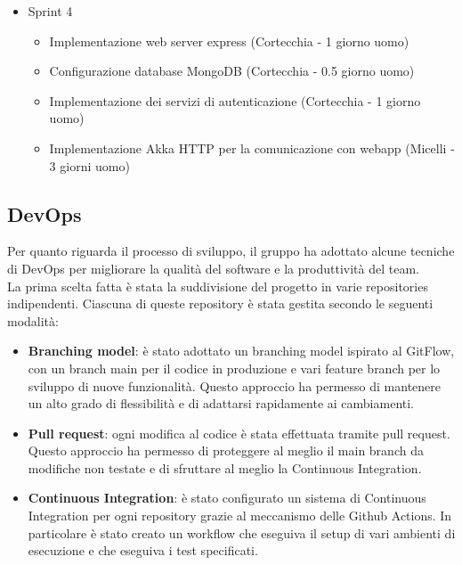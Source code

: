 \begin{itemize}
\begin{itemize}
          \end{itemize}
    \item Sprint 4
          \begin{itemize}
              \item Implementazione web server express (Cortecchia - 1 giorno uomo)
              \item Configurazione database MongoDB (Cortecchia - 0.5 giorno uomo)
              \item Implementazione dei servizi di autenticazione (Cortecchia - 1 giorno uomo)
              \item Implementazione Akka HTTP per la comunicazione con webapp (Micelli - 3 giorni uomo)
          \end{itemize}
\end{itemize}

\subsection{DevOps}
Per quanto riguarda il processo di sviluppo, il gruppo ha adottato alcune tecniche di DevOps per migliorare la qualità del software e la produttività del team.\\
La prima scelta fatta è stata la suddivisione del progetto in varie repositories indipendenti. Ciascuna di queste repository è stata gestita secondo le seguenti modalità:

\begin{itemize}
    \item \textbf{Branching model}: è stato adottato un branching model ispirato al GitFlow, con un branch main per il codice in produzione e vari feature branch per lo sviluppo di nuove funzionalità. Questo approccio ha permesso di mantenere un alto grado di flessibilità e di adattarsi rapidamente ai cambiamenti.
    \item \textbf{Pull request}: ogni modifica al codice è stata effettuata tramite pull request. Questo approccio ha permesso di proteggere al meglio il main branch da modifiche non testate e di sfruttare al meglio la Continuous Integration.
    \item \textbf{Continuous Integration}: è stato configurato un sistema di Continuous Integration per ogni repository grazie al meccanismo delle Github Actions. In particolare è stato creato un workflow che eseguiva il setup di vari ambienti di esecuzione e che eseguiva i test specificati.
\end{itemize}



